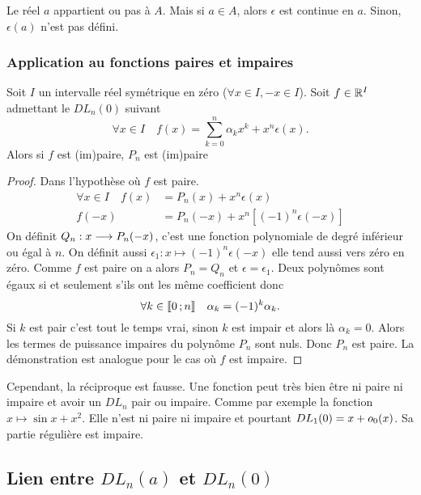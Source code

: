 Le réel \(a\) appartient ou pas à \(A\). Mais si \(a \in A\), alors \(\epsilon\) est continue en \(a\). Sinon, \(\epsilon(a)\) n'est pas défini.

\subsubsection{Application au fonctions paires et impaires}
\begin{prop}
  Soit \(I\) un intervalle réel symétrique en zéro (\(\forall x \in I, -x \in I\)). Soit \(f \in \mathbb{R}^I\) admettant le \(DL_n(0)\) suivant
  \begin{equation}
    \forall x \in I \quad f(x)=\sum_{k=0}^n \alpha_k x^k + x^n \epsilon(x).
  \end{equation}
  Alors si \(f\) est (im)paire, \(P_n\) est (im)paire
\end{prop}
\begin{proof}
  Dans l'hypothèse où \(f\) est paire.
  \begin{align}
    \forall x \in I \quad f(x)&= P_n(x)+ x^n\epsilon(x)\\
    f(-x)&= P_n(-x) + x^n [(-1)^n \epsilon(-x)]
  \end{align}
  On définit \(Q_n:x \longrightarrow P_n(-x)\), c'est une fonction polynomiale de degré inférieur ou égal à \(n\). On définit aussi \(\epsilon_1 :x \longmapsto (-1)^n \epsilon(-x)\) elle tend aussi vers zéro en zéro. Comme \(f\) est paire on a alors \(P_n = Q_n\) et \(\epsilon = \epsilon_1\). Deux polynômes sont égaux si et seulement s'ils ont les même coefficient donc
\begin{equation}
  \forall k \in \mathopen{\llbracket}0\mathclose{}\mathpunct{};n\mathclose{\rrbracket} \quad \alpha_k = (-1)^k \alpha_k.
\end{equation}
Si \(k\) est pair c'est tout le temps vrai, sinon \(k\) est impair et alors là \(\alpha_k=0\). Alors les termes de puissance impaires du polynôme \(P_n\) sont nuls. Donc \(P_n\) est paire. La démonstration est analogue pour le cas où \(f\) est impaire.
\end{proof}

Cependant, la réciproque est fausse. Une fonction peut très bien être ni paire ni impaire et avoir un \(DL_n\) pair ou impaire.  Comme par exemple la fonction \(x \longmapsto \sin x +x^2\). Elle n'est ni paire ni impaire et pourtant \(DL_1(0)=x+o\mathopen{}_{0}\left(x\right)\). Sa partie régulière est impaire.

\subsection{Lien entre \(DL_n(a)\) et \(DL_n(0)\)}

